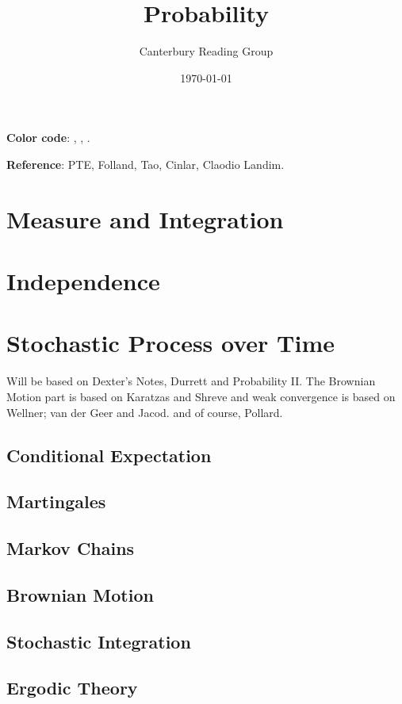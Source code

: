 \documentclass[12pt, oneside]{book}
\begin{document}
    \title{Probability}\author{Canterbury Reading Group}\date{\today}
    \setcounter{tocdepth}{3}
    \tableofcontents

    \textbf{Color code}: , , . 

    \textbf{Reference}: PTE, Folland, Tao, Cinlar, Claodio Landim.
    \chapter{Measure and Integration}
    \chapter{Independence}
    \chapter{Stochastic Process over Time}
        Will be based on Dexter's Notes, Durrett and Probability II. The Brownian Motion part is based on Karatzas and Shreve and weak convergence is based on Wellner; van der Geer and Jacod. and of course, Pollard. 
        \section{Conditional Expectation}
        \section{Martingales}
        \section{Markov Chains}
        \section{Brownian Motion}
        \section{Stochastic Integration}
        \section{Ergodic Theory}
\end{document}
